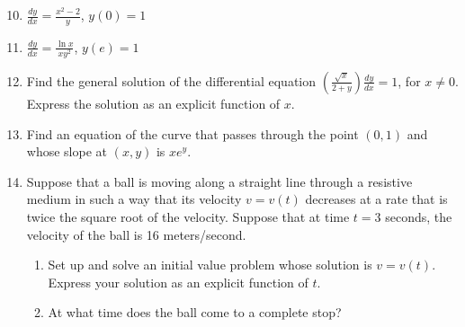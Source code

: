 \documentclass[12pt]{article}
\newif\ifans
\begin{document}
\begin{enumerate}
\setcounter{enumi}{9}

\item $\frac{dy}{dx}=\frac{x^2-2}{y}$, $y(0)=1$

\ifans{\fbox{$y=\sqrt{\frac{2x^3}{3}-4x+1}$}} \fi

\item $\frac{dy}{dx}=\frac{\ln{x}}{xy^2}$, $y(e)=1$

\ifans{\fbox{$y=\sqrt[3]{\frac{3(\ln{x})^2-1}{2}}$}} \fi

\item Find the general solution of the differential equation $\left(\frac{\sqrt{x}}{2+y}\right)\frac{dy}{dx}=1$, for $x \neq 0$.  Express the solution as an explicit function of $x$.

\ifans{\fbox{$y=Ce^{2\sqrt{x}}-2$, $C \neq 0$}} \fi

\item Find an equation of the curve that passes through the point $(0,1)$ and whose slope at $(x,y)$ is $xe^y$.

\ifans{\fbox{$y=-\ln{\left(\frac{1}{e}-\frac{x^2}{2}\right)}$; Detailed Solution: \textcolor{blue}{\href{http://www.math.drexel.edu/classes/Calculus/resources/Math122HW/Solutions/122_14_ODE_13.pdf}{Here}}}} \fi


\item Suppose that a ball is moving along a straight line through a resistive medium in such a way that its velocity $v=v(t)$ decreases at a rate that is twice the square root of the velocity.  Suppose that at time $t=3$ seconds, the velocity of the ball is 16 meters/second.

\begin{enumerate}

\item Set up and solve an initial value problem whose solution is $v=v(t)$.  Express your solution as an explicit function of $t$.

\ifans{\fbox{\parbox{1\linewidth}{Initial Value Problem:
$\left\{\begin{array}{l}
\frac{dv}{dt}=-2\sqrt{v}\\
\\
v(3)=16
\end{array}\right.$; Solution:
$v(t)=(7-t)^2$}}} \fi

\item At what time does the ball come to a complete stop?

\ifans{\fbox{The ball will stop at $t=7$ seconds.}} \fi


\end{enumerate}
\end{enumerate}
\end{document}

